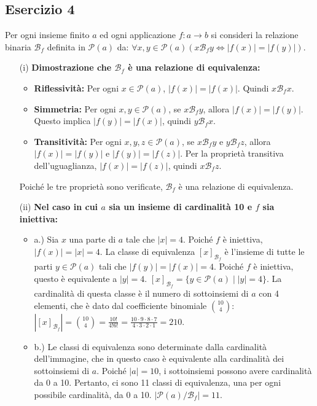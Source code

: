 \subsection*{Esercizio 4}
Per ogni insieme finito $a$ ed ogni applicazione $f:a\rightarrow b$ si consideri la relazione binaria $\mathcal{B}_{f}$ definita in $\mathcal{P}(a)$ da:
$\forall x,y\in\mathcal{P}(a)(x\mathcal{B}_{f}y\iff|f(x)|=|f(y)|)$.
\begin{itemize}
    \item[(i)] \textbf{Dimostrazione che $\mathcal{B}_{f}$ è una relazione di equivalenza:}
    \begin{itemize}
        \item \textbf{Riflessività:} Per ogni $x\in\mathcal{P}(a)$, $|f(x)|=|f(x)|$. Quindi $x\mathcal{B}_{f}x$.
        \item \textbf{Simmetria:} Per ogni $x,y\in\mathcal{P}(a)$, se $x\mathcal{B}_{f}y$, allora $|f(x)|=|f(y)|$. Questo implica $|f(y)|=|f(x)|$, quindi $y\mathcal{B}_{f}x$.
        \item \textbf{Transitività:} Per ogni $x,y,z\in\mathcal{P}(a)$, se $x\mathcal{B}_{f}y$ e $y\mathcal{B}_{f}z$, allora $|f(x)|=|f(y)|$ e $|f(y)|=|f(z)|$. Per la proprietà transitiva dell'uguaglianza, $|f(x)|=|f(z)|$, quindi $x\mathcal{B}_{f}z$.
    \end{itemize}
    Poiché le tre proprietà sono verificate, $\mathcal{B}_{f}$ è una relazione di equivalenza.

    \item[(ii)] \textbf{Nel caso in cui $a$ sia un insieme di cardinalità 10 e $f$ sia iniettiva:}
    \begin{itemize}
        \item a.) Sia $x$ una parte di $a$ tale che $|x|=4$. Poiché $f$ è iniettiva, $|f(x)|=|x|=4$.
        La classe di equivalenza $[x]_{\mathcal{B}_{f}}$ è l'insieme di tutte le parti $y\in\mathcal{P}(a)$ tali che $|f(y)|=|f(x)|=4$. Poiché $f$ è iniettiva, questo è equivalente a $|y|=4$.
        $[x]_{\mathcal{B}_{f}} = \{ y\in\mathcal{P}(a) \mid |y|=4 \}$.
        La cardinalità di questa classe è il numero di sottoinsiemi di $a$ con 4 elementi, che è dato dal coefficiente binomiale $\binom{10}{4}$:
        $|[x]_{\mathcal{B}_{f}}| = \binom{10}{4} = \frac{10!}{4!6!} = \frac{10\cdot9\cdot8\cdot7}{4\cdot3\cdot2\cdot1} = 210$.
        \item b.) Le classi di equivalenza sono determinate dalla cardinalità dell'immagine, che in questo caso è equivalente alla cardinalità dei sottoinsiemi di $a$. Poiché $|a|=10$, i sottoinsiemi possono avere cardinalità da 0 a 10. Pertanto, ci sono 11 classi di equivalenza, una per ogni possibile cardinalità, da 0 a 10.
        $|\mathcal{P}(a)/\mathcal{B}_{f}| = 11$.
    \end{itemize}


\end{itemize}
